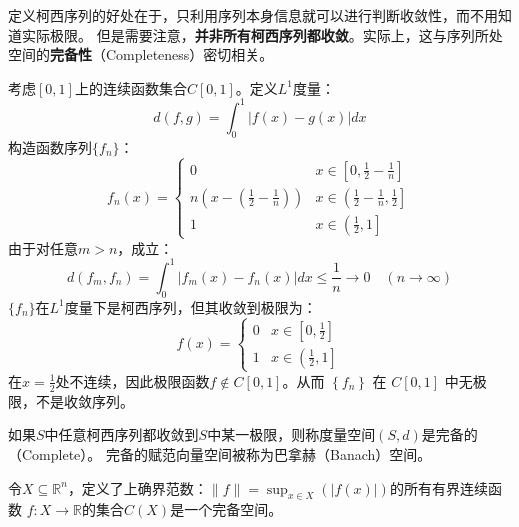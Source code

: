 定义柯西序列的好处在于，只利用序列本身信息就可以进行判断收敛性，而不用知道实际极限。
但是需要注意，\textbf{并非所有柯西序列都收敛}。实际上，这与序列所处空间的\textbf{完备性}（Completeness）密切相关。
\begin{example}
    考虑$\left[0,1\right]$上的连续函数集合$C\left[0,1\right]$。定义$L^1$度量：
    \begin{equation*}
        d\left(f,g\right) = \int_{0}^{1}\left|f\left(x\right)-g\left(x\right)\right|dx
    \end{equation*}
    构造函数序列$\{f_n\}$：
    \begin{equation*}
    f_n(x) = 
        \begin{cases}0 & x \in\left[0, \frac{1}{2}-\frac{1}{n}\right] \\ 
            n\left(x-\left(\frac{1}{2}-\frac{1}{n}\right)\right) & x 
                \in\left(\frac{1}{2}-\frac{1}{n}, \frac{1}{2}\right] \\ 
            1 & x \in\left(\frac{1}{2}, 1\right] 
        \end{cases}
    \end{equation*}
    由于对任意$m>n$，成立：
    \begin{equation*}
        d\left(f_m, f_n\right)=\int_0^1\left|f_m(x)-f_n(x)\right| d x \leq \frac{1}{n} \rightarrow 0 
            \quad(n \rightarrow \infty)
    \end{equation*}
    $\{f_n\}$在$L^1$度量下是柯西序列，但其收敛到极限为：
    \begin{equation*}
        f(x) = 
            \begin{cases}0 & x \in\left[0, \frac{1}{2}\right] \\ 
                1 & x \in\left(\frac{1}{2}, 1\right]
            \end{cases}
    \end{equation*}
    在$x=\frac{1}{2}$处不连续，因此极限函数$f \notin C[0,1]$。从而 $\left\{f_n\right\}$ 在 $C[0,1]$ 中无极限，不是收敛序列。
\end{example}

\begin{definition}
    如果$S$中任意柯西序列都收敛到$S$中某一极限，则称度量空间$\left(S,d\right)$是完备的（Complete）。
    完备的赋范向量空间被称为巴拿赫（Banach）空间。
\end{definition}

\begin{theorem} \label{th-complete-continuous-func-space}
    令$X \subseteq \mathbb{R}^n$，定义了上确界范数：$\|f\|=\sup _{x \in X}(|f(x)|)$的所有有界连续函数
    $f: X \rightarrow \mathbb{R}$的集合$C(X)$是一个完备空间。
\end{theorem}

